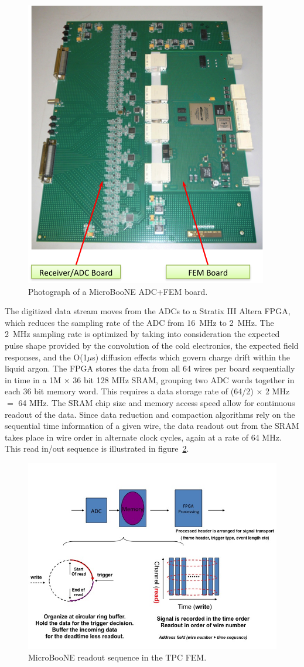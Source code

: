 \begin{figure}
\centering
\includegraphics[width=0.6\linewidth]{./figures/readout_2.png}%
\caption{\label{fig:readout_2}Photograph of a MicroBooNE ADC+FEM board.}
\end{figure}

The digitized data stream moves from the ADCs to a Stratix III Altera FPGA, which reduces the sampling rate of the ADC from 16~MHz to 2~MHz. The 2~MHz sampling rate is optimized by taking into consideration the expected pulse shape provided by the convolution of the cold electronics, the expected \lartpc field responses, and the O(1$\mu$s) diffusion effects which govern charge drift within the liquid argon. The FPGA stores the data from all 64 wires per board sequentially in time in a 1M $\times$ 36 bit 128 MHz SRAM, grouping two ADC words together in each 36 bit memory word. This requires a data storage rate of (64/2) $\times$ 2 MHz $=$ 64 MHz.  The SRAM chip size and memory access speed allow for continuous readout of the \lartpc data. Since data reduction and compaction algorithms rely on the sequential time information of a given wire, the data readout out from the SRAM takes place in wire order in alternate clock cycles, again at a rate of 64 MHz. This read in/out sequence is illustrated in figure~\ref{fig:readout_3}.

\begin{figure}
\centering
\includegraphics[width=0.8\linewidth]{./figures/readout_3.jpg}%
\caption{\label{fig:readout_3}MicroBooNE readout sequence in the TPC FEM.}
\end{figure}

